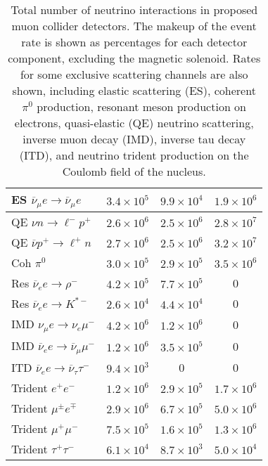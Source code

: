 \begin{table}[t]
\begin{ruledtabular}
\begin{tabular}{lccc}
    \\
    ES $\overline\nu_{\mu} e \to \overline\nu_{\mu} e$     
    & $3.4\times 10^{5}$ & $9.9\times 10^{4}$ & $1.9\times 10^{6}$     
    \\\hline
    QE $\nu n \to \ell^- p^+$ 
    & $2.6\times 10^{6}$ & $2.5\times 10^{6}$ & $2.8\times 10^{7}$ 
    \\
    QE $\overline\nu p^+ \to \ell^+ n$ 
    & $2.7\times 10^{6}$ & $2.5\times 10^{6}$ & $3.2\times 10^{7}$ 
    \\
    Coh $\pi^0$ 
    & $3.0\times 10^{5}$ & $2.9\times 10^{5}$ & $3.5\times 10^{6}$ 
    \\
    Res $\overline\nu_{e} e \to \rho^-$     
    & $4.2\times 10^{5}$ & $7.7\times 10^{5}$ & 0     
    \\
    Res $\overline\nu_{e} e \to K^{*-}$     
    & $2.6\times 10^{4}$ & $4.4\times 10^{4}$ & 0     
    \\\hline
    IMD $\nu_\mu e \to \nu_e \mu^-$ 
    & $4.2\times 10^{6}$ & $1.2\times 10^{6}$ & 0 
    \\  
    IMD $\overline\nu_e e \to \overline\nu_\mu \mu^-$ 
    & $1.2\times 10^{6}$ & $3.5\times 10^{5}$ & 0 
    \\  
    ITD $\overline\nu_e e \to \overline\nu_\tau \tau^-$ 
    & $9.4\times 10^{3}$ & 0 & 0 
    \\\hline
    Trident $e^+e^-$ 
    & $1.2\times 10^{6}$ & $2.9\times 10^{5}$ & $1.7\times 10^{6}$ 
    \\
    Trident $\mu^\pm e^\mp$ 
    & $2.9\times 10^{6}$ & $6.7\times 10^{5}$ & $5.0\times 10^{6}$ 
    \\
    Trident $\mu^+\mu^-$ 
    & $7.5\times 10^{5}$ & $1.6\times 10^{5}$ & $1.3\times 10^{6}$ 
    \\
    Trident $\tau^+\tau^-$ 
    & $6.1\times 10^{4}$ & $8.7\times 10^{3}$ & $5.0\times 10^{4}$ 
    \\\hline
\end{tabular}
  \end{ruledtabular}
  \caption{Total number of neutrino interactions in proposed muon collider detectors. The makeup of the event rate is shown as percentages for each detector component, excluding the magnetic solenoid.
  Rates for some exclusive scattering channels are also shown, including elastic scattering (ES), coherent $\pi^0$ production, resonant meson production on electrons, quasi-elastic (QE) neutrino scattering, inverse muon decay (IMD), inverse tau decay (ITD), and neutrino trident production on the Coulomb field of the nucleus.}
  \label{tab:event_rate_makeup}
\end{table}

